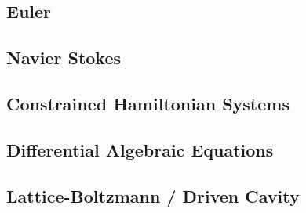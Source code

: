 \documentclass[12pt]{article}
\begin{document}
\subsection{Euler}

\subsection{Navier Stokes}

\subsection{Constrained Hamiltonian Systems}

\subsection{Differential Algebraic Equations}

\subsection{Lattice-Boltzmann / Driven Cavity}
\end{document}

